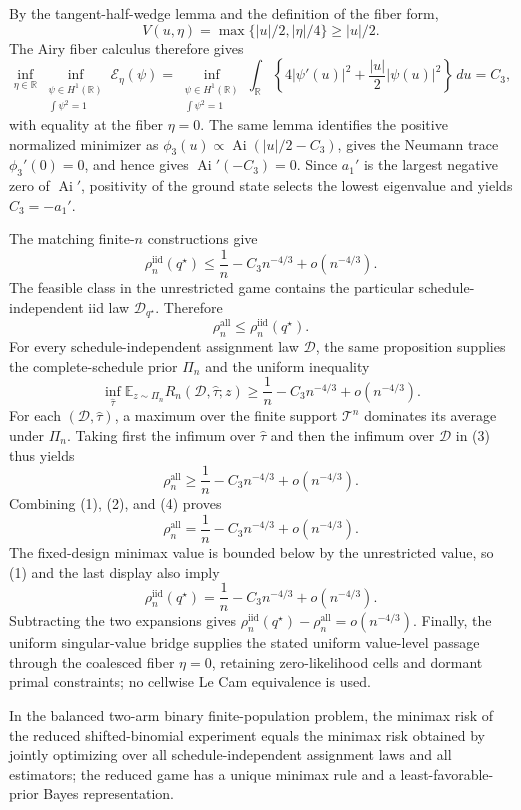 By the tangent-half-wedge lemma and the definition of the fiber form,
\[
V(u,\eta)=\max\{|u|/2,|\eta|/4\}\geq |u|/2.
\]
The Airy fiber calculus therefore gives
\[
\inf_{\eta\in\mathbb R}\inf_{\substack{\psi\in H^1(\mathbb R)\\
\int\psi^2=1}}\mathcal E_\eta(\psi)
=\inf_{\substack{\psi\in H^1(\mathbb R)\\\int\psi^2=1}}
\int_{\mathbb R}\left\{4|\psi'(u)|^2+\frac{|u|}{2}|\psi(u)|^2\right\}\,du
=C_3,
\]
with equality at the fiber \(\eta=0\).  The same lemma identifies the positive normalized minimizer as
\(\phi_3(u)\propto\operatorname{Ai}(|u|/2-C_3)\), gives the Neumann trace
\(\phi_3'(0)=0\), and hence gives \(\operatorname{Ai}'(-C_3)=0\).  Since
\(a_1'\) is the largest negative zero of \(\operatorname{Ai}'\), positivity of the ground state selects the lowest eigenvalue and yields \(C_3=-a_1'\).

The matching finite-\(n\) constructions give
\[
\rho_n^{\mathrm{iid}}(q^\star)
\leq \frac1n-C_3n^{-4/3}+o(n^{-4/3}).
\tag{1}
\]
The feasible class in the unrestricted game contains the particular schedule-independent iid law \(\mathcal D_{q^\star}\).  Therefore
\[
\rho_n^{\mathrm{all}}\leq \rho_n^{\mathrm{iid}}(q^\star).
\tag{2}
\]
For every schedule-independent assignment law \(\mathcal D\), the same proposition supplies the complete-schedule prior \(\Pi_n\) and the uniform inequality
\[
\inf_{\widehat\tau}
\mathbb E_{z\sim\Pi_n}R_n(\mathcal D,\widehat\tau;z)
\geq \frac1n-C_3n^{-4/3}+o(n^{-4/3}).
\tag{3}
\]
For each \((\mathcal D,\widehat\tau)\), a maximum over the finite support
\(\mathcal T^n\) dominates its average under \(\Pi_n\).  Taking first the infimum over \(\widehat\tau\) and then the infimum over \(\mathcal D\) in (3) thus yields
\[
\rho_n^{\mathrm{all}}
\geq \frac1n-C_3n^{-4/3}+o(n^{-4/3}).
\tag{4}
\]
Combining (1), (2), and (4) proves
\[
\rho_n^{\mathrm{all}}
=\frac1n-C_3n^{-4/3}+o(n^{-4/3}).
\]
The fixed-design minimax value is bounded below by the unrestricted value, so (1) and the last display also imply
\[
\rho_n^{\mathrm{iid}}(q^\star)
=\frac1n-C_3n^{-4/3}+o(n^{-4/3}).
\]
Subtracting the two expansions gives
\(\rho_n^{\mathrm{iid}}(q^\star)-\rho_n^{\mathrm{all}}=o(n^{-4/3})\).
Finally, the uniform singular-value bridge supplies the stated uniform value-level passage through the coalesced fiber \(\eta=0\), retaining zero-likelihood cells and dormant primal constraints; no cellwise Le Cam equivalence is used.

In the balanced two-arm binary finite-population problem, the minimax risk of the reduced shifted-binomial experiment equals the minimax risk obtained by jointly optimizing over all schedule-independent assignment laws and all estimators; the reduced game has a unique minimax rule and a least-favorable-prior Bayes representation.

